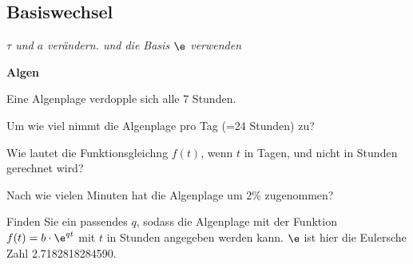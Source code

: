 \subsection{Basiswechsel}
\textit{$\tau$ und $a$ verändern. und die Basis $\e$ verwenden}






\bbwActAufgabenNr{} \textbf{Algen}

Eine Algenplage verdopple sich alle 7 Stunden.

\begin{bbwAufgabenBlock}

\item Um wie viel nimmt die Algenplage pro Tag (=24 Stunden) zu?



\item Wie lautet die Funktionsgleichng $f(t)$, wenn $t$ in Tagen, und nicht in Stunden gerechnet wird?


\item Nach wie vielen Minuten hat die Algenplage um 2\% zugenommen?


\item Finden Sie ein passendes $q$, sodass die Algenplage mit der Funktion $f(t) = b\cdot{}\e^{qt}$ mit $t$ in Stunden angegeben werden kann. $\e$ ist hier die Eulersche Zahl 2.7182818284590.



\end{bbwAufgabenBlock}


\platzFuerBerechnungenBisEndeSeite{}





